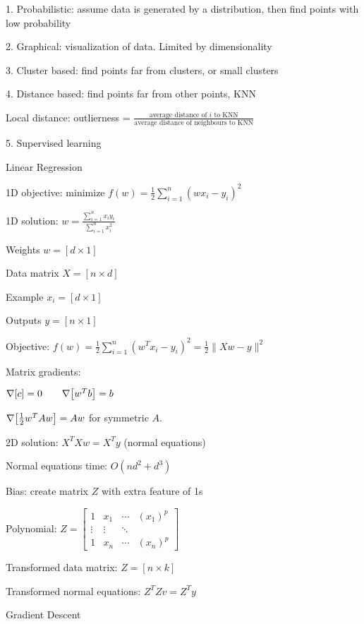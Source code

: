 \documentclass[10pt]{article}
\makeatletter
\newcommand{\tab}{\hspace{.02\textwidth}}
\newcommand{\sqb}[1]{\left[#1\right]}
\let\originalleft\left
\let\originalright\right
\renewcommand{\left}{\mathopen{}\mathclose\bgroup\originalleft}
\renewcommand{\right}{\aftergroup\egroup\originalright}
\renewcommand{\section}{\@startsection{section}{1}{0ex}{-1ex}{0.7ex}
                        {\normalfont\normalsize\bfseries}}
\newcommand{\mat}[1]{\begin{bmatrix}#1\end{bmatrix}}
\newcommand{\norm}[1]{\lVert #1 \rVert}
\makeatother
\begin{document}
\begin{multicols*}{3}
1. Probabilistic: assume data is generated by a distribution, then find points with low probability

2. Graphical: visualization of data. Limited by dimensionality

3. Cluster based: find points far from clusters, or small clusters 

4. Distance based: find points far from other points, KNN

Local distance: outlierness = $\frac{\text{average distance of }i\text{ to KNN}}{\text{average distance of neighbours to KNN}}$

5. Supervised learning 

\section{Linear Regression}

1D objective: minimize $f(w)=\frac 12\sum_{i=1}^n(wx_i-y_i)^2$

1D solution: $w=\frac{\sum_{i=1}^n x_iy_i}{\sum_{i=1}^n x_i^2}$

Weights $w=[d \times 1]$

Data matrix $X=[n \times d]$

Example $x_i=[d \times 1]$

Outputs $y=[n \times 1]$

Objective: $f(w)=\frac 12\sum_{i=1}^n(w^Tx_i-y_i)^2=\frac 12\norm{Xw-y}^2$

Matrix gradients:

\tab $\nabla\sqb{c}=0\qquad\nabla\sqb{w^Tb}=b$

\tab $\nabla\sqb{\frac 12w^TAw}=Aw$ for symmetric $A$.

2D solution: $X^TXw=X^Ty$ (normal equations)

Normal equations time: $O(nd^2+d^3)$

Bias: create matrix $Z$ with extra feature of 1s

Polynomial: $Z=\mat{1 & x_1 & \cdots & (x_1)^p \\ \vdots & \vdots & \ddots \\ 1 & x_n & \cdots & (x_n)^p}$

Transformed data matrix: $Z=[n\times k]$

Transformed normal equations: $Z^TZv=Z^Ty$

\section{Gradient Descent}


\end{multicols*}
\end{document}
